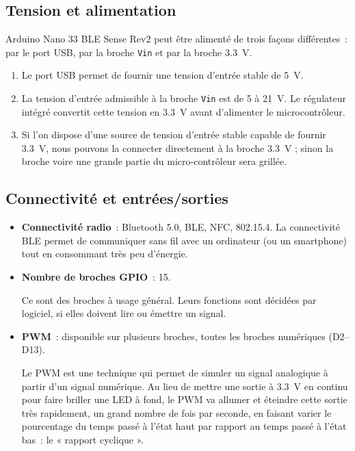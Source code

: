 \documentclass[a4paper,12pt,twoside]{report}
\theoremstyle{definition}
\theoremstyle{plain}
\theoremstyle{remark}
\begin{document}
\subsection{Tension et alimentation}

Arduino Nano 33 \ac{BLE} Sense Rev2 peut être alimenté de trois façons différentes~: par le port \ac{USB}, par la broche \texttt{Vin} et par la broche \SI{3.3}{\volt}.
\begin{enumerate}
	\item Le port \ac{USB} permet de fournir une tension d'entrée stable de \SI{5}{\volt}.
	
	\item La tension d'entrée admissible à la broche \texttt{Vin} est de 5 à \SI{21}{\volt}. Le régulateur intégré convertit cette tension en \SI{3.3}{\volt} avant d'alimenter le microcontrôleur.
	
	\item Si l'on dispose d'une source de tension d'entrée stable capable de fournir \SI{3.3}{\volt}, nous pouvons la connecter directement à la broche \SI{3.3}{\volt} ; sinon la broche voire une grande partie du micro-contrôleur sera grillée.
\end{enumerate}

\subsection{Connectivité et entrées/sorties}

\begin{itemize}
	\item \textbf{Connectivité radio}~: Bluetooth 5.0, \ac{BLE}, \ac{NFC}, 802.15.4. La connectivité \ac{BLE} permet de communiquer sans fil avec un ordinateur (ou un smartphone) tout en consommant très peu d'énergie.
	
	\item \textbf{Nombre de broches \ac{GPIO}}~: 15.
	
	Ce sont des broches à usage général. Leurs fonctions sont décidées par logiciel, si elles doivent lire ou émettre un signal.
	
	\item \textbf{\ac{PWM}}~: disponible sur plusieurs broches, toutes les broches numériques (D2--D13).
	
	Le \ac{PWM} est une technique qui permet de simuler un signal analogique à partir d'un signal numérique. Au lieu de mettre une sortie à \SI{3.3}{\volt} en continu pour faire briller une \ac{LED} à fond, le \ac{PWM} va allumer et éteindre cette sortie très rapidement, un grand nombre de fois par seconde, en faisant varier le pourcentage du temps passé à l'état haut par rapport au temps passé à l'état bas~: le « rapport cyclique ».
\end{itemize}
\end{document}
